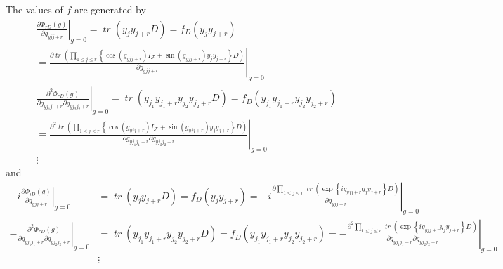 \documentclass[aps,preprint]{revtex4}%
\begin{document}
The values of $f$ are generated by
\begin{align}
&  \left.  \frac{\partial\Phi_{rD}\left(  g\right)  }{\partial\mathit{g}%
_{yjj+r}}\right\vert _{g=0}=\mathit{\operatorname*{tr}}\left(  y_{j}%
y_{j+r}D\right)  =f_{D}\left(  y_{j}y_{j+r}\right)  \\
&  \left.  =\right.  \left.  \frac{\partial\mathit{\operatorname*{tr}}\left(
{\textstyle\prod\limits_{1\leq j\leq r}}
\left\{  \cos\left(  \mathit{g}_{yjj+r}\right)  I_{\mathcal{F}}+\sin\left(
\mathit{g}_{yjj+r}\right)  y_{j}y_{j+r}\right\}  D\right)  }{\partial
\mathit{g}_{yjj+r}}\right\vert _{g=0}\\
&  \left.  \frac{\partial^{2}\Phi_{rD}\left(  g\right)  }{\partial
\mathit{g}_{yj_{1}j_{1}+r}\partial\mathit{g}_{yj_{2}j_{2}+r}}\right\vert
_{g=0}=\mathit{\operatorname*{tr}}\left(  y_{j_{1}}y_{j_{1}+r}y_{j_{2}%
}y_{j_{2}+r}D\right)  =f_{D}\left(  y_{j_{1}}y_{j_{1}+r}y_{j_{2}}y_{j_{2}%
+r}\right)  \\
&  \left.  =\right.  \left.  \frac{\partial^{2}\mathit{\operatorname*{tr}%
}\left(
{\textstyle\prod\limits_{1\leq j\leq r}}
\left\{  \cos\left(  \mathit{g}_{yjj+r}\right)  I_{\mathcal{F}}+\sin\left(
\mathit{g}_{yjj+r}\right)  y_{j}y_{j+r}\right\}  D\right)  }{\partial
\mathit{g}_{yj_{1}j_{1}+r}\partial\mathit{g}_{yj_{2}j_{2}+r}}\right\vert
_{g=0}\\
&  \vdots
\end{align}
and
\begin{align}
-i\left.  \frac{\partial\Phi_{iD}\left(  g\right)  }{\partial\mathit{g}%
_{yjj+r}}\right\vert _{g=0} &  =\mathit{\operatorname*{tr}}\left(
y_{j}y_{j+r}D\right)  =f_{D}\left(  y_{j}y_{j+r}\right)  =-i\left.
\frac{\partial%
{\textstyle\prod\limits_{1\leq j\leq r}}
\mathit{\operatorname*{tr}}\left(  \exp\left\{  i\mathit{g}_{yjj+r}%
y_{j}y_{j+r}\right\}  D\right)  }{\partial\mathit{g}_{yjj+r}}\right\vert
_{g=0}\\
-\left.  \frac{\partial^{2}\Phi_{rD}\left(  g\right)  }{\partial
\mathit{g}_{yj_{1}j_{1}+r}\partial\mathit{g}_{yj_{2}j_{2}+r}}\right\vert
_{g=0} &  =\mathit{\operatorname*{tr}}\left(  y_{j_{1}}y_{j_{1}+r}y_{j_{2}%
}y_{j_{2}+r}D\right)  =f_{D}\left(  y_{j_{1}}y_{j_{1}+r}y_{j_{2}}y_{j_{2}%
+r}\right)  =-\left.  \frac{\partial^{2}%
{\textstyle\prod\limits_{1\leq j\leq r}}
\mathit{\operatorname*{tr}}\left(  \exp\left\{  i\mathit{g}_{yjj+r}%
y_{j}y_{j+r}\right\}  D\right)  }{\partial\mathit{g}_{yj_{1}j_{1}+r}%
\partial\mathit{g}_{yj_{2}j_{2}+r}}\right\vert _{g=0}\\
&  \vdots
\end{align}
\end{document}
